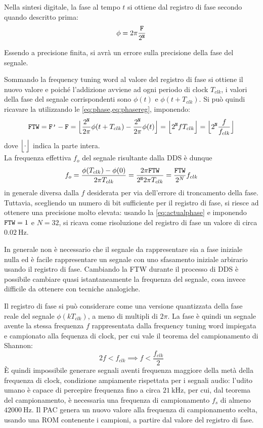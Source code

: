 Nella sintesi digitale, la fase al tempo $t$ si ottiene dal registro di fase secondo quando descritto prima:
\begin{equation}
\label{eq:phasereg}
\phi = 2\pi\frac{\texttt{F}}{2^{\texttt{N}}}
\end{equation}

Essendo  a precisione finita, si avrà un errore sulla precisione della fase del segnale.

Sommando la frequency tuning word al valore del registro di fase  si ottiene il nuovo valore 
e poiché l'addizione avviene ad ogni periodo di clock $T_{clk}$, i valori della fase del segnale corrispondenti sono
$\phi(t)$ e $\phi(t + T_{clk})$.
Si può quindi ricavare la  utilizzando le
\cref{eq:phase,eq:phasereg}, imponendo:
\[
\texttt{FTW} = \texttt{F'} - \texttt{F} = 
\Big \lfloor\frac{2^{\texttt{N}}}{2\pi}\phi(t+T_{clk}) - \frac{2^{\texttt{N}}}{2\pi}\phi(t)\Big \rfloor
= \Big \lfloor2^{\texttt{N}} f T_{clk}\Big \rfloor = \Big \lfloor2^{\texttt{N}} \frac{f}{f_{clk}}\Big \rfloor
\]
dove $\floor{\cdot}$ indica la parte intera. \\
La frequenza effettiva $f_{o}$ del segnale risultante dalla DDS è dunque
\begin{equation}
\label{eq:actualphase}
f_{o} = \frac{\phi(T_{clk}) - \phi(0)}{2\pi T_{clk}} = \frac{2\pi \texttt{FTW}}{2^{\texttt{N}} 2 \pi T_{clk}} = \frac{\texttt{FTW}}{2^N} f_{clk}
\end{equation}
in generale diversa dalla $f$ desiderata per via dell'errore di troncamento della fase.
Tuttavia, scegliendo un numero di bit sufficiente per il registro di fase, si riesce
ad ottenere una precisione molto elevata: usando la \cref{eq:actualphase}
e imponendo $\texttt{FTW}=1$ e $N=32$, si ricava come risoluzione del registro di fase 
un valore di circa $\SI{0.02}{\hertz}$.

In generale non è necessario che il segnale da rappresentare sia a fase
iniziale nulla ed è facile rappresentare un segnale con uno sfasamento
iniziale arbirario usando il registro di fase.
Cambiando la FTW durante il processo di DDS è possibile cambiare
quasi istantaneamente la frequenza del segnale, cosa invece difficile
da ottenere con tecniche analogiche.

Il registro di fase si può considerare come una versione quantizzata della
fase reale del segnale $\phi(k T_{clk})$, a meno di multipli di $2\pi$.
La fase è quindi un segnale avente la stessa frequenza $f$ rappresentata dalla frequency
tuning word impiegata e campionato alla fequenza di clock, per cui vale il teorema
del campionamento di Shannon:
\[
   2f < f_{clk} \implies f < \frac{f_{clk}}{2}
\]
È quindi impossibile generare segnali aventi frequenza maggiore della metà della
frequenza di clock, condizione ampiamente rispettata per i segnali audio:
l'udito umano è capace di percepire frequenza fino a circa $\SI{21}{\kilo\hertz}$, 
per cui, dal teorema del campionamento, è necessaria una frequenza di campionamento $f_s$ di almeno $\SI{42000}{\hertz}$.
Il PAC genera un nuovo valore alla frequenza di campionamento scelta, usando
una ROM contenente i campioni, a partire dal valore del registro di fase.

